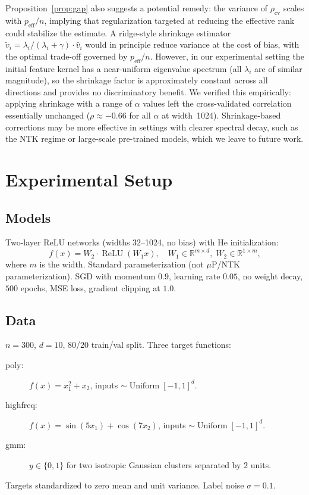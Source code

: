 \documentclass[10pt]{article}
\begin{document}
Proposition~\ref{prop:gap} also suggests a potential remedy: the variance of $\rho_{\text{cv}}$ scales with $p_{\text{eff}} / n$, implying that regularization targeted at reducing the effective rank could stabilize the estimate.  A ridge-style shrinkage estimator $\tilde{v}_i = \lambda_i / (\lambda_i + \gamma) \cdot \hat{v}_i$ would in principle reduce variance at the cost of bias, with the optimal trade-off governed by $p_{\text{eff}} / n$.  However, in our experimental setting the initial feature kernel has a near-uniform eigenvalue spectrum (all $\lambda_i$ are of similar magnitude), so the shrinkage factor is approximately constant across all directions and provides no discriminatory benefit.  We verified this empirically: applying shrinkage with a range of $\alpha$ values left the cross-validated correlation essentially unchanged ($\rho \approx -0.66$ for all $\alpha$ at width~1024).  Shrinkage-based corrections may be more effective in settings with clearer spectral decay, such as the NTK regime or large-scale pre-trained models, which we leave to future work.

\section{Experimental Setup}
\label{sec:setup}

\subsection{Models}
Two-layer ReLU networks (widths 32--1024, no bias) with He initialization:
\[
f(x)=W_{2}\cdot\operatorname{ReLU}(W_{1}x),\quad
W_{1}\in\mathbb{R}^{m\times d},\; W_{2}\in\mathbb{R}^{1\times m},
\]
where $m$ is the width.  Standard parameterization (not $\mu$P/NTK parameterization).  SGD with momentum $0.9$, learning rate $0.05$, no weight decay, $500$ epochs, MSE loss, gradient clipping at $1.0$.

\subsection{Data}
$n=300$, $d=10$, 80/20 train/val split.  Three target functions:
\begin{description}
    \item[poly:] $f(x)=x_{1}^{2}+x_{2}$, inputs $\sim\operatorname{Uniform}[-1,1]^{d}$.
    \item[highfreq:] $f(x)=\sin(5x_{1})+\cos(7x_{2})$, inputs $\sim\operatorname{Uniform}[-1,1]^{d}$.
    \item[gmm:] $y\in\{0,1\}$ for two isotropic Gaussian clusters separated by $2$ units.
\end{description}
Targets standardized to zero mean and unit variance.  Label noise $\sigma=0.1$.
\end{document}
